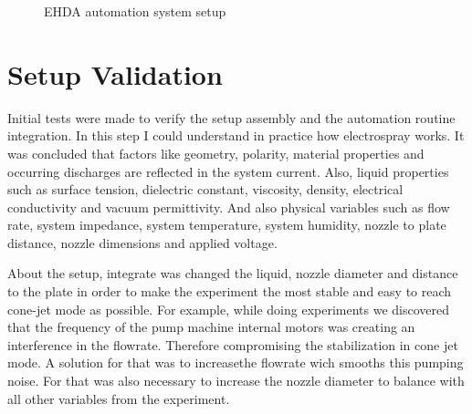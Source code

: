 \begin{figure}[H]
  \centering
  \caption{EHDA automation system setup}
  \label{fig:setup_pic}
\end{figure}


\section{Setup Validation}
\label{sec:setup_validation}


Initial tests were made to verify the setup assembly and the automation routine integration. In this step I could understand in practice how electrospray works.
It was concluded that factors like geometry, polarity, material properties and occurring discharges are reflected in the system current.
Also, liquid properties such as surface tension, dielectric constant, viscosity, density, electrical conductivity and vacuum permittivity. 
 And also physical variables such as flow rate, system impedance, system temperature, system humidity, nozzle to plate distance, nozzle dimensions and applied voltage.


 About the setup, integrate was changed the liquid, nozzle diameter and distance to the plate in order to
make the experiment the most stable and easy to reach cone-jet mode as possible. For example, while doing experiments we discovered that the frequency of the pump machine internal motors was creating an interference in the flowrate. Therefore compromising the stabilization in cone jet mode. A solution for that was to increasethe flowrate wich smooths this pumping noise. For that was also necessary to increase the nozzle diameter to balance with all other variables from the experiment.
